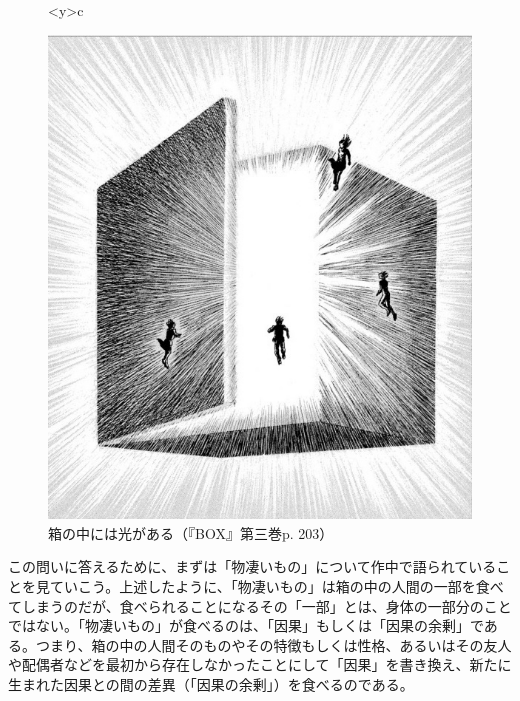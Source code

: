 \documentclass[9pt,b5j,twoside,twocolumn]{utarticle}
\begin{document}
\begin{figure}[h]
\begin{tabular}<y>{c}
\begin{minipage}[c]{0.65\hsize}
\centering
\includegraphics[clip, scale=0.34]{物凄いもの}
\caption{箱の中には光がある（『BOX』第三巻p. 203）}
\end{minipage}
\end{tabular}
\end{figure}

この問いに答えるために、まずは「物凄いもの」について作中で語られていることを見ていこう。上述したように、「物凄いもの」は箱の中の人間の一部を食べてしまうのだが、食べられることになるその「一部」とは、身体の一部分のことではない。「物凄いもの」が食べるのは、「因果」もしくは「因果の余剰」である。つまり、箱の中の人間そのものやその特徴もしくは性格、あるいはその友人や配偶者などを最初から存在しなかったことにして「因果」を書き換え、新たに生まれた因果との間の差異（「因果の余剰」）を食べるのである。
\end{document}
